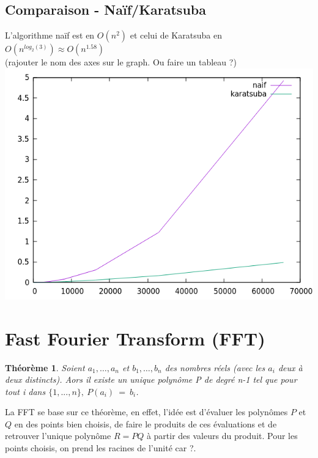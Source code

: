\documentclass[12pt, a4paper]{article}
\begin{document}
\subsection{Comparaison - Naïf/Karatsuba}
L'algorithme naïf est en $O(n^2)$ et celui de Karatsuba en $O(n^{log_2(3)}) \approx O(n^{1.58})$ \\
(rajouter le nom des axes sur le graph. Ou faire un tableau ?) \\
\includegraphics[scale=1]{naif_kara}\\


\section{Fast Fourier Transform (FFT)}

\newtheorem{Thm1}{Théorème}
\begin{Thm1}
Soient $a_1,\dots,a_n$ et $b_1,\dots,b_n$ des nombres réels (avec les $a_i$ deux à deux distincts). Aors il existe un unique polynôme P de degré n-1 tel que pour tout i dans $\{1,..., n\},\ P(a_i)\ =\ b_i$.
\end{Thm1}

La FFT se base sur ce théorème, en effet, l’idée est d’évaluer les polynômes $P$ et $Q$ en des points bien choisis, de faire le produits de ces évaluations et de retrouver l’unique polynôme $R=PQ$ à partir des valeurs du produit. Pour les points choisis, on prend les racines de l’unité car ?.
 
\end{document}
